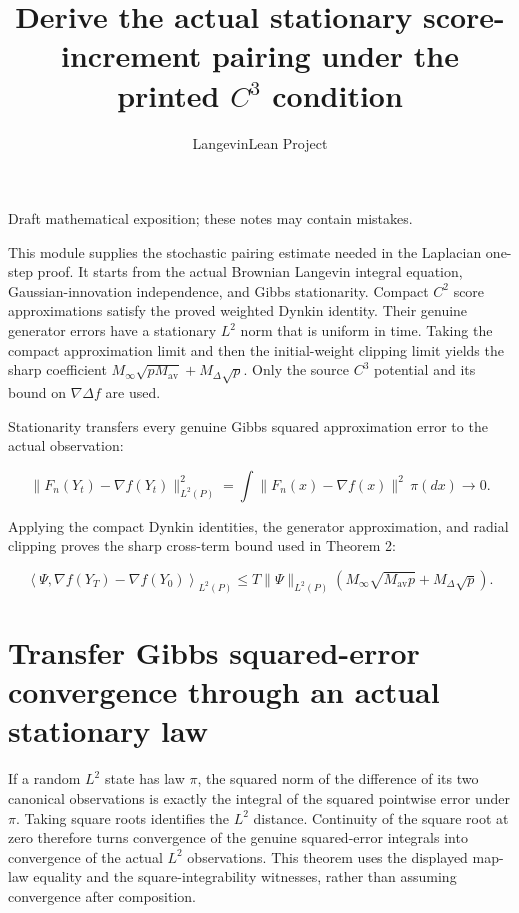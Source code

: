 \documentclass[11pt,a4paper]{article}
\title{\texorpdfstring{Derive the actual stationary score-increment pairing under the printed \(C^{3}\) condition}{Derive the actual stationary score-increment pairing under the printed C³ condition}}
\author{LangevinLean Project}
\date{}
\begin{document}
\maketitle
Draft mathematical exposition; these notes may contain mistakes.


This module supplies the stochastic pairing estimate needed in the Laplacian one-step proof. It starts from the actual Brownian Langevin integral equation, Gaussian-innovation independence, and Gibbs stationarity. Compact \(C^{2}\) score approximations satisfy the proved weighted Dynkin identity. Their genuine generator errors have a stationary \(L^{2}\) norm that is uniform in time. Taking the compact approximation limit and then the initial-weight clipping limit yields the sharp coefficient \(M_\infty\sqrt{pM_{\mathrm{av}}}+M_\Delta\sqrt p\). Only the source \(C^{3}\) potential and its bound on \(\nabla\Delta f\) are used.



Stationarity transfers every genuine Gibbs squared approximation error to the actual observation:


\[\|F_n(Y_t)-\nabla f(Y_t)\|_{L^2(P)}^2
=\int\|F_n(x)-\nabla f(x)\|^2\,\pi(dx)\longrightarrow0.\]


Applying the compact Dynkin identities, the generator approximation, and radial clipping proves the sharp cross-term bound used in Theorem 2:


\[\left\langle\Psi,\nabla f(Y_T)-\nabla f(Y_0)\right\rangle_{L^2(P)}
\le T\|\Psi\|_{L^2(P)}
\left(M_\infty\sqrt{M_{\mathrm{av}}p}+M_\Delta\sqrt p\right).\]
\section{\texorpdfstring{Transfer Gibbs squared-error convergence through an actual stationary law}{Transfer Gibbs squared-error convergence through an actual stationary law}}


If a random \(L^{2}\) state has law \(\pi\), the squared norm of the difference of its two canonical observations is exactly the integral of the squared pointwise error under \(\pi\). Taking square roots identifies the \(L^{2}\) distance. Continuity of the square root at zero therefore turns convergence of the genuine squared-error integrals into convergence of the actual \(L^{2}\) observations. This theorem uses the displayed map-law equality and the square-integrability witnesses, rather than assuming convergence after composition.
\end{document}

